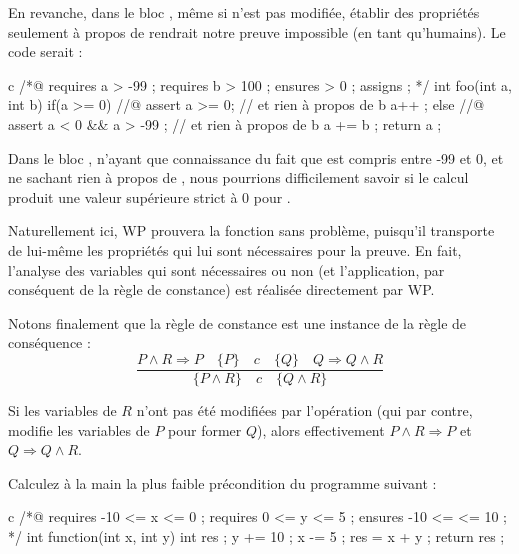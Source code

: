 En revanche, dans le bloc , même si  n'est pas modifiée, établir
des propriétés seulement à propos de  rendrait notre preuve impossible (en
tant qu'humains). Le code serait :



\begin{CodeBlock}{c}
/*@
  requires a > -99 ;
  requires b > 100 ;
  ensures  \result > 0 ;
  assigns  \nothing ;
*/
int foo(int a, int b){
  if(a >= 0){
    //@ assert a >= 0; // et rien à propos de b
    a++ ;
  } else {
    //@ assert a < 0 && a > -99 ; // et rien à propos de b
    a += b ;
  }
  return a ;
}
\end{CodeBlock}



Dans le bloc , n'ayant que connaissance du fait que  est compris
entre -99 et 0, et ne sachant rien à propos de , nous pourrions 
difficilement savoir si le calcul  produit une valeur supérieure
strict à 0 pour .



Naturellement ici, WP prouvera la fonction sans problème, puisqu'il transporte
de lui-même les propriétés qui lui sont nécessaires pour la preuve. En fait,
l'analyse des variables qui sont nécessaires ou non (et l'application, par 
conséquent de la règle de constance) est réalisée directement par WP.



Notons finalement que la règle de constance est une instance de la règle de 
conséquence :
$$\dfrac{P \wedge R \Rightarrow P \quad \{P\}\quad c\quad \{Q\} \quad Q \Rightarrow Q \wedge R}{\{P \wedge R\}\quad c\quad \{Q \wedge R\}}$$



Si les variables de $R$ n'ont pas été modifiées par l'opération (qui par contre, 
modifie les variables de $P$ pour former $Q$), alors effectivement 
$P \wedge R \Rightarrow P$ et $Q \Rightarrow Q \wedge R$.



 



Calculez à la main la plus faible précondition du programme suivant :


\begin{CodeBlock}{c}
/*@
  requires -10 <= x <= 0 ;
  requires 0 <= y <= 5 ;
  ensures -10 <= \result <= 10 ;
*/
int function(int x, int y){
  int res ;
  y += 10 ;
  x -= 5 ;
  res = x + y ;
  return res ;
}
\end{CodeBlock}


